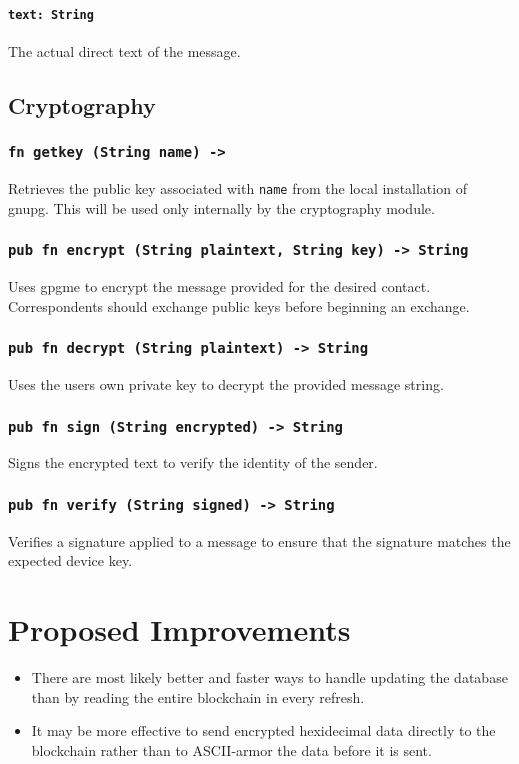 \documentclass[]{article}
\begin{document}
\paragraph{\texttt{text: String}}
The actual direct text of the message.

\subsection{Cryptography}
\subsubsection{\texttt{fn getkey (String name) -> }}
Retrieves the public key associated with \verb|name| from the local installation of gnupg. This will be used only internally by the cryptography module.
\subsubsection{\texttt{pub fn encrypt (String plaintext, String key) -> String}}
Uses gpgme to encrypt the message provided for the desired contact. Correspondents should exchange public keys before beginning an exchange.
\subsubsection{\texttt{pub fn decrypt (String plaintext) -> String}}
Uses the users own private key to decrypt the provided message string.
\subsubsection{\texttt{pub fn sign (String encrypted) -> String}}
Signs the encrypted text to verify the identity of the sender.
\subsubsection{\texttt{pub fn verify (String signed) -> String}}
Verifies a signature applied to a message to ensure that the signature matches the expected device key.

\section{Proposed Improvements}
\begin{itemize}
  \item There are most likely better and faster ways to handle updating the database than by reading the entire blockchain in every refresh.
  \item It may be more effective to send encrypted hexidecimal data directly to the blockchain rather than to ASCII-armor the data before it is sent.
\end{itemize}

\pagebreak

  \printbibliography{}
\end{document}
